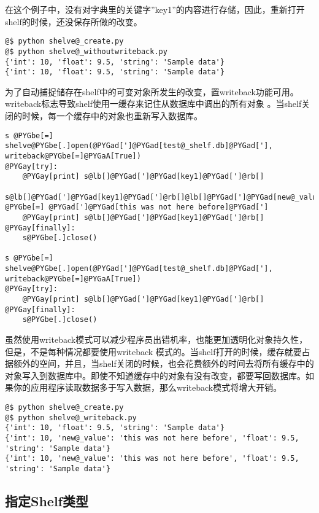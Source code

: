 \documentclass[a4paper,10pt,english]{manual}
\begin{document}
在这个例子中，没有对字典里的关键字''key1''的内容进行存储，因此，重新打开shelf的时候，还没保存所做的改变。

\begin{Verbatim}[commandchars=@\[\]]
@$ python shelve@_create.py
@$ python shelve@_withoutwriteback.py
{'int': 10, 'float': 9.5, 'string': 'Sample data'}
{'int': 10, 'float': 9.5, 'string': 'Sample data'}
\end{Verbatim}

为了自动捕捉储存在shelf中的可变对象所发生的改变，置writeback功能可用。writeback标志导致shelf使用一缓存来记住从数据库中调出的所有对象 。当shelf关闭的时候，每一个缓存中的对象也重新写入数据库。

\begin{Verbatim}[commandchars=@\[\]]
s @PYGbe[=] shelve@PYGbe[.]open(@PYGad[']@PYGad[test@_shelf.db]@PYGad['], writeback@PYGbe[=]@PYGaA[True])
@PYGay[try]:
    @PYGay[print] s@lb[]@PYGad[']@PYGad[key1]@PYGad[']@rb[]
    s@lb[]@PYGad[']@PYGad[key1]@PYGad[']@rb[]@lb[]@PYGad[']@PYGad[new@_value]@PYGad[']@rb[] @PYGbe[=] @PYGad[']@PYGad[this was not here before]@PYGad[']
    @PYGay[print] s@lb[]@PYGad[']@PYGad[key1]@PYGad[']@rb[]
@PYGay[finally]:
    s@PYGbe[.]close()

s @PYGbe[=] shelve@PYGbe[.]open(@PYGad[']@PYGad[test@_shelf.db]@PYGad['], writeback@PYGbe[=]@PYGaA[True])
@PYGay[try]:
    @PYGay[print] s@lb[]@PYGad[']@PYGad[key1]@PYGad[']@rb[]
@PYGay[finally]:
    s@PYGbe[.]close()
\end{Verbatim}

虽然使用writeback模式可以减少程序员出错机率，也能更加透明化对象持久性，但是，不是每种情况都要使用writeback 模式的。当shelf打开的时候，缓存就要占据额外的空间，并且，当shelf关闭的时候，也会花费额外的时间去将所有缓存中的对象写入到数据库中。即使不知道缓存中的对象有没有改变，都要写回数据库。如果你的应用程序读取数据多于写入数据，那么writeback模式将增大开销。

\begin{Verbatim}[commandchars=@\[\]]
@$ python shelve@_create.py
@$ python shelve@_writeback.py
{'int': 10, 'float': 9.5, 'string': 'Sample data'}
{'int': 10, 'new@_value': 'this was not here before', 'float': 9.5, 'string': 'Sample data'}
{'int': 10, 'new@_value': 'this was not here before', 'float': 9.5, 'string': 'Sample data'}
\end{Verbatim}


\subsection{指定Shelf类型}
\end{document}

